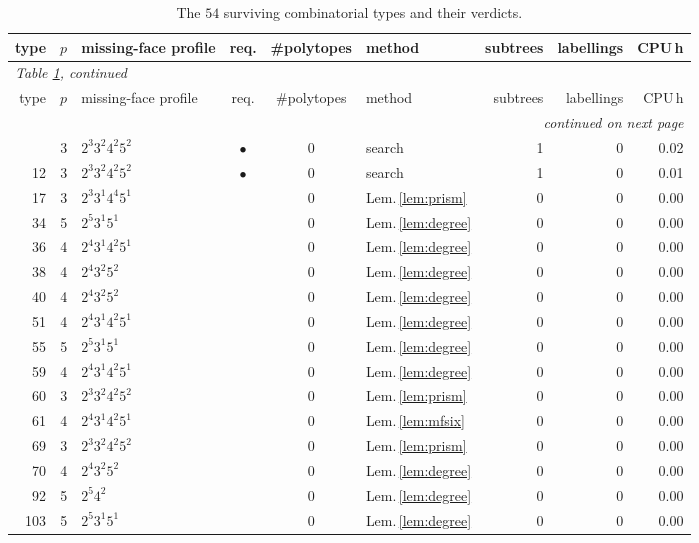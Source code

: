 \documentclass[11pt,reqno]{amsart}
\theoremstyle{plain}
\theoremstyle{definition}
\newcommand{\NumSurvivors}{54}
\begin{document}
{\small
\begin{longtable}{r r l c c l r r r}
\caption{The $\NumSurvivors$ surviving combinatorial types and their
verdicts.\label{tab:pertype}}\\
\toprule
type & $p$ & missing-face profile & req. & \#polytopes & method & subtrees &
labellings & CPU\,h\\
\midrule
\endfirsthead
\multicolumn{9}{l}{\small\emph{Table \ref{tab:pertype}, continued}}\\
\toprule
type & $p$ & missing-face profile & req. & \#polytopes & method & subtrees &
labellings & CPU\,h\\
\midrule
\endhead
\midrule
\multicolumn{9}{r}{\small\emph{continued on next page}}\\
\endfoot
\bottomrule
\endlastfoot
8 & 3 & $2^{3}3^{2}4^{2}5^{2}$ & $\bullet$ & 0 & search & 1 & 0 & 0.02 \\
12 & 3 & $2^{3}3^{2}4^{2}5^{2}$ & $\bullet$ & 0 & search & 1 & 0 & 0.01 \\
17 & 3 & $2^{3}3^{1}4^{4}5^{1}$ &  & 0 & Lem.\,\ref{lem:prism} & 0 & 0 & 0.00 \\
34 & 5 & $2^{5}3^{1}5^{1}$ &  & 0 & Lem.\,\ref{lem:degree} & 0 & 0 & 0.00 \\
36 & 4 & $2^{4}3^{1}4^{2}5^{1}$ &  & 0 & Lem.\,\ref{lem:degree} & 0 & 0 & 0.00 \\
38 & 4 & $2^{4}3^{2}5^{2}$ &  & 0 & Lem.\,\ref{lem:degree} & 0 & 0 & 0.00 \\
40 & 4 & $2^{4}3^{2}5^{2}$ &  & 0 & Lem.\,\ref{lem:degree} & 0 & 0 & 0.00 \\
51 & 4 & $2^{4}3^{1}4^{2}5^{1}$ &  & 0 & Lem.\,\ref{lem:degree} & 0 & 0 & 0.00 \\
55 & 5 & $2^{5}3^{1}5^{1}$ &  & 0 & Lem.\,\ref{lem:degree} & 0 & 0 & 0.00 \\
59 & 4 & $2^{4}3^{1}4^{2}5^{1}$ &  & 0 & Lem.\,\ref{lem:degree} & 0 & 0 & 0.00 \\
60 & 3 & $2^{3}3^{2}4^{2}5^{2}$ &  & 0 & Lem.\,\ref{lem:prism} & 0 & 0 & 0.00 \\
61 & 4 & $2^{4}3^{1}4^{2}5^{1}$ &  & 0 & Lem.\,\ref{lem:mfsix} & 0 & 0 & 0.00 \\
69 & 3 & $2^{3}3^{2}4^{2}5^{2}$ &  & 0 & Lem.\,\ref{lem:prism} & 0 & 0 & 0.00 \\
70 & 4 & $2^{4}3^{2}5^{2}$ &  & 0 & Lem.\,\ref{lem:degree} & 0 & 0 & 0.00 \\
92 & 5 & $2^{5}4^{2}$ &  & 0 & Lem.\,\ref{lem:degree} & 0 & 0 & 0.00 \\
103 & 5 & $2^{5}3^{1}5^{1}$ &  & 0 & Lem.\,\ref{lem:degree} & 0 & 0 & 0.00 \\

\end{longtable}}
\end{document}
